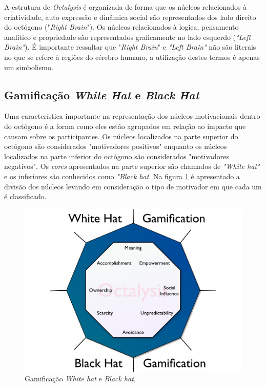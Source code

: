 A estrutura de \textit{Octalysis} é organizada de forma que os núcleos relacionados à criatividade, auto expressão e dinâmica social são
representados dos lado direito do octógono ("\textit{Right Brain}"). Os núcleos relacionados à logica, pensamento analítico e propriedade são representados graficamente
no lado esquerdo (\textit{"Left Brain"}). É importante ressaltar que "\textit{Right Brain}" e \textit{"Left Brain"} não são literais no que se refere
à regiões do cérebro humano, a utilização destes termos é apenas um simbolismo.

\subsection{Gamificação \textit{White Hat} e \textit{Black Hat}}

Uma característica importante na representação dos núcleos motivacionais dentro do octógono é a forma como eles estão agrupados em relação ao impacto
que causam sobre os participantes. Os núcleos localizados na parte superior do octógono são considerados "motivadores positivos" enquanto os núcleos localizados
na parte inferior do octógono são considerados "motivadores negativos". Os \textit{cores} apresentados na parte superior são chamados de \textit{"White hat"} e os inferiores
são conhecidos como \textit{"Black hat}. Na figura \ref{octogono} é apresentado a divisão dos núcleos levando em consideração o tipo de motivador em que cada um
é classificado.

\begin{figure}[h]
	\centering
	\includegraphics[keepaspectratio=true,scale=0.28]{figuras/octogono.jpg}
	\caption{Gamificação \textit{White hat} e \textit{Black hat}, }
	\label{octogono}
\end{figure}

